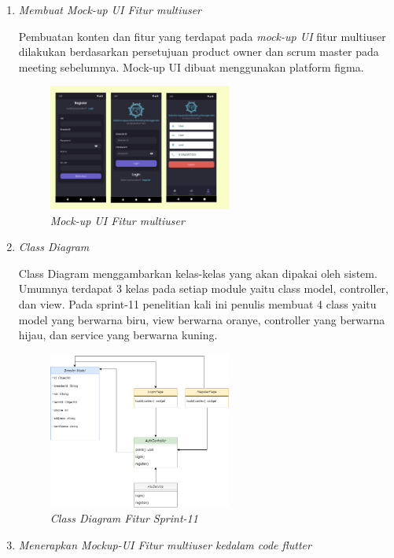 \begin{enumerate}[listparindent=2em]
	
	\item{\textit{Membuat Mock-up UI Fitur multiuser}}
	
	Pembuatan konten dan fitur yang terdapat pada \textit{mock-up UI} fitur multiuser dilakukan berdasarkan persetujuan product owner dan scrum master pada meeting sebelumnya. Mock-up UI dibuat menggunakan platform figma.
	
	\begin{figure}[H]
	\centering
	\includegraphics[keepaspectratio, width=6cm]{gambar/mockupmultiuser}
	\caption{\textit{Mock-up UI Fitur multiuser}}
	\label{gambar:mockupmultiuser}
	\end{figure}

	\item{\textit{Class Diagram}}
	
	Class Diagram menggambarkan kelas-kelas yang akan dipakai oleh sistem. Umumnya terdapat 3 kelas pada setiap module yaitu class model, controller, dan view. Pada sprint-11 penelitian kali ini penulis membuat 4 class yaitu model yang berwarna biru, view berwarna oranye, controller yang berwarna hijau, dan service yang berwarna kuning.
	 
	 \begin{figure}[H]
	 \centering
	 \includegraphics[keepaspectratio, width=6cm]{gambar/authcd}
	 \caption{\textit{Class Diagram Fitur Sprint-11}}
	 \label{gambar:authcd}
	 \end{figure}

	\item{\textit{Menerapkan Mockup-UI Fitur multiuser kedalam code flutter}}
	

\end{enumerate}
